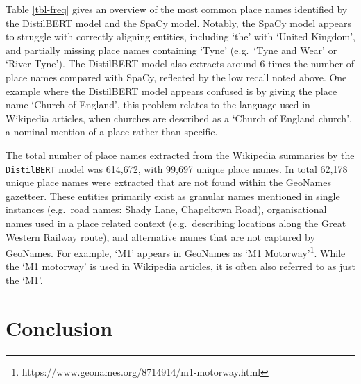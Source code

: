 \documentclass[
  letterpaper,
  11pt,
  english,
  onehalfspacing,
  headsepline]{MastersDoctoralThesis}
\begin{document}
Table \ref{tbl-freq} gives an overview of the most common place names
identified by the DistilBERT model and the SpaCy model. Notably, the
SpaCy model appears to struggle with correctly aligning entities,
including `the' with `United Kingdom', and partially missing place names
containing `Tyne' (e.g.~`Tyne and Wear' or `River Tyne'). The DistilBERT
model also extracts around 6 times the number of place names compared
with SpaCy, reflected by the low recall noted above. One example where
the DistilBERT model appears confused is by giving the place name
`Church of England', this problem relates to the language used in
Wikipedia articles, when churches are described as a `Church of England
church', a nominal mention of a place rather than specific.

The total number of place names extracted from the Wikipedia summaries
by the \texttt{DistilBERT} model was 614,672, with 99,697 unique place
names. In total 62,178 unique place names were extracted that are not
found within the GeoNames gazetteer. These entities primarily exist as
granular names mentioned in single instances (e.g.~road names: Shady
Lane, Chapeltown Road), organisational names used in a place related
context (e.g.~describing locations along the Great Western Railway
route), and alternative names that are not captured by GeoNames. For
example, `M1' appears in GeoNames as `M1 Motorway'\footnote{https://www.geonames.org/8714914/m1-motorway.html}.
While the `M1 motorway' is used in Wikipedia articles, it is often also
referred to as just the `M1'.

\hypertarget{conclusion}{%
\section{Conclusion}\label{conclusion}}
\end{document}
